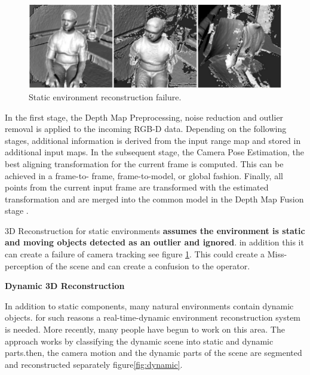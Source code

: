 \begin{figure}[h]
    \centering
    \includegraphics[scale=0.5]{images/static_failure.png}
    \caption{Static environment reconstruction failure. \cite{Keller:2013:RRD:2544744.2544784}}
    \label{fig:staticfailure}
\end{figure}

In the first stage, the Depth Map Preprocessing, noise reduction and outlier removal is applied to the incoming RGB-D data. Depending on the following stages, additional information is derived from the input range map and stored in additional input maps. In the subsequent stage, the Camera Pose Estimation, the best aligning transformation for the current frame is computed. This can be achieved in a frame-to- frame, frame-to-model, or global fashion. Finally, all points from the current input frame are transformed with the estimated transformation and are merged into the common model in the Depth Map Fusion stage \cite{Zollhofer2018}.

3D Reconstruction for static environments \textbf{assumes the environment is static and moving objects detected as an outlier and ignored}. in addition this it can create a failure of camera tracking see figure \ref{fig:staticfailure}. This could create a Miss- perception of the scene and can create a confusion to the operator.

\textbf{Dynamic 3D Reconstruction}

In addition to static components, many natural environments contain dynamic objects. for such reasons a real-time-dynamic environment reconstruction system is needed. More recently, many people have begun to work on this area. The approach works by classifying the dynamic scene into static and dynamic parts.then, the camera motion and the dynamic parts of the scene are segmented and reconstructed separately figure\ref{fig:dynamic}.

